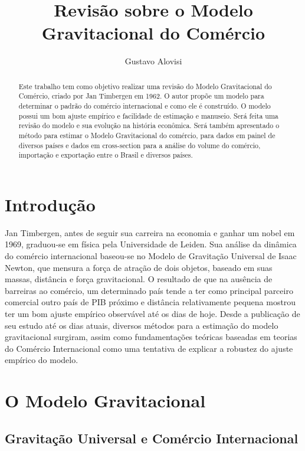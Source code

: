 \documentclass[12pt]{article}
\title{Revisão sobre o Modelo Gravitacional do Comércio}
\author{Gustavo Alovisi}
\begin{document}
\maketitle

\begin{abstract}
Este trabalho tem como objetivo realizar uma revisão do Modelo Gravitacional do Comércio, criado por Jan Timbergen em 1962. O autor propõe um modelo para determinar o padrão do comércio internacional e como ele é construído. O modelo possui um bom ajuste empírico e facilidade de estimação e manuseio. Será feita uma revisão do modelo e sua evolução na história econômica. Será também apresentado o método para estimar o Modelo Gravitacional do comércio, para dados em painel de diversos países e dados em cross-section para a análise do volume do comércio, importação e exportação entre o Brasil e diversos países. 
\end{abstract}

\section{Introdução}

Jan Timbergen, antes de seguir sua carreira na economia e ganhar um nobel em 1969, graduou-se em física pela Universidade de Leiden. Sua análise da dinâmica do comércio internacional baseou-se no Modelo de Gravitação Universal de Isaac Newton, que mensura a força de atração de dois objetos, baseado em suas massas, distância e força gravitacional. O resultado de que na ausência de barreiras ao comércio, um determinado país tende a ter como principal parceiro comercial outro país de PIB próximo e distância relativamente pequena mostrou ter um bom ajuste empírico observável até os dias de hoje. Desde a publicação de seu estudo até os dias atuais, diversos métodos para a estimação do modelo gravitacional surgiram, assim como fundamentações teóricas baseadas em teorias do Comércio Internacional como uma tentativa de explicar a robustez do ajuste empírico do modelo. 

\section{O Modelo Gravitacional}

\subsection{Gravitação Universal e Comércio Internacional}
\end{document}

